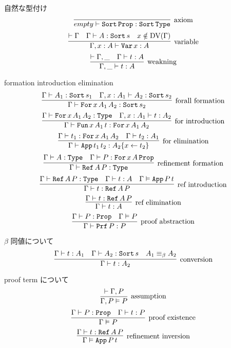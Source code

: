 \documentclass[dvipdfmx]{jsarticle}
\begin{document}
\begin{itembox}[l]{自然な型付け}
  \[\infer[\text{axiom}]{empty \vdash \texttt{Sort} \, \texttt{Prop} : \texttt{Sort} \, \texttt{Type}}{}\]
  \[\infer[\text{variable}]{\Gamma , x : A \vdash \texttt{Var} \, x : A}{\vdash \Gamma & \Gamma \vdash A : \texttt{Sort} \, s & x \notin \text{DV}(\Gamma)}\]
  \[\infer[\text{weakning}]{\Gamma , \_ \vdash t : A}{\vdash \Gamma , \_ & \Gamma \vdash t : A}\]
\end{itembox}

\begin{itembox}[l]{formation introduction elimination}
  \[\infer[\text{forall formation}]{\Gamma \vdash \texttt{For} \, x \, A_1 \, A_2 : \texttt{Sort} \, s_2}{\Gamma \vdash A_1 : \texttt{Sort} \, s_1 & \Gamma , x : A_1 \vdash A_2 : \texttt{Sort} \, s_2}\]
  \[\infer[\text{for introduction}]{\Gamma \vdash \texttt{Fun} \, x \, A_1 \, t : \texttt{For} \, x \, A_1 \, A_2}{\Gamma \vdash \texttt{For} \, x \, A_1 \, A_2 : \texttt{Type} & \Gamma , x : A_1 \vdash t : A_2} \]
  \[\infer[\text{for elimination}]{\Gamma \vdash \texttt{App} \, t_1 \, t_2 : A_2\{x \leftarrow t_2\}}{\Gamma \vdash t_1 : \texttt{For} \, x \, A_1 \, A_2 & \Gamma \vdash t_2 : A_1} \]
  \[\infer[\text{refinement formation}]{\Gamma \vdash \texttt{Ref} \, A \, P : \texttt{Type}}{\Gamma \vdash A : \texttt{Type} & \Gamma \vdash P : \texttt{For} \, x \, A \, \texttt{Prop}}\]
  \[\infer[\text{ref introduction}]{\Gamma \vdash t : \texttt{Ref} \, A \, P}{\Gamma \vdash \texttt{Ref} \, A \, P : \texttt{Type} & \Gamma \vdash t : A & \Gamma \vDash \texttt{App} \, P \, t} \]
  \[\infer[\text{ref elimination}]{\Gamma \vdash t : A}{\Gamma \vdash t : \texttt{Ref} \, A \, P} \]
  \[\infer[\text{proof abstraction}]{\Gamma \vdash \texttt{Prf} \, P : P}{\Gamma \vdash P : \texttt{Prop} &\Gamma \vDash P} \]
\end{itembox}

\begin{itembox}[l]{\(\beta\) 同値について}
  \[\infer[\text{conversion}]{\Gamma \vdash t : A_2}{\Gamma \vdash t : A_1 & \Gamma \vdash A_2 : \texttt{Sort} \, s & A_1 \equiv_{\beta} A_2} \]
\end{itembox}

\begin{itembox}[l]{proof term について}
  \[\infer[\text{assumption}]{\Gamma , P \vDash P}{\vdash \Gamma , P}\]
  \[\infer[\text{proof existence}]{\Gamma \vDash P}{\Gamma \vdash P : \texttt{Prop} & \Gamma \vdash t : P}\]
  \[\infer[\text{refinement inversion}]{\Gamma \vDash \texttt{App} \, P \, t}{\Gamma \vdash t : \texttt{Ref} \, A \, P}\]
\end{itembox}
\end{document}
